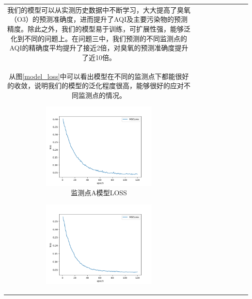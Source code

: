 \documentclass[bwprint]{gmcmthesis}
\numberwithin{figure}{section}
\begin{document}
\begin{table}
\begin{center}
{\begin{tabular}[ht]{|c|c|c|c|c|c|c|c|c|}
我们的模型可以从实测历史数据中不断学习，大大提高了臭氧（O3）的预测准确度，进而提升了AQI及主要污染物的预测精度。除此之外，我们的模型易于训练，可扩展性强，能够泛化到不同的问题上。在问题三中，我们预测的不同监测点的AQI的精确度平均提升了接近2倍，对臭氧的预测准确度提升了近10倍。\\
从图\ref{model_loss}中可以看出模型在不同的监测点下都能很好的收敛，说明我们的模型的泛化程度很高，能够很好的应对不同监测点的情况。
\begin{figure}
	\centering
	\begin{subfigure}[ht]{.3\textwidth}
		\centering
		\includegraphics[width=\textwidth]{figures/model_loss.png}
		\caption{监测点A模型LOSS}
		\label{A_model_loss}
	\end{subfigure}
	\begin{subfigure}[ht]{.3\textwidth}
		\centering
		\includegraphics[width=\textwidth]{figures/model_loss_B.png}

\end{subfigure}
\end{figure}
\end{tabular}}
\end{center}
\end{table}
\end{document}
